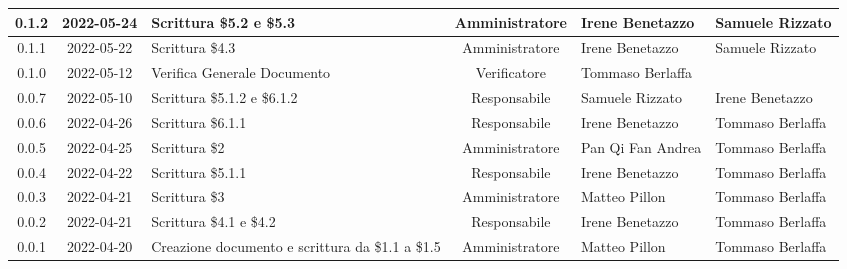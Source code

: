 \begin{center}
\begin{longtable}{ |c|c|p{8em}|c|m{5em}|m{5em}| }
	\hline
	0.1.2 & 2022-05-24 & Scrittura \$5.2 e \$5.3 & Amministratore & Irene \newline Benetazzo & Samuele \newline Rizzato \\
	\hline
	0.1.1 & 2022-05-22 & Scrittura \$4.3 & Amministratore & Irene \newline Benetazzo & Samuele \newline Rizzato \\
	\hline 
	0.1.0 & 2022-05-12 & Verifica Generale Documento & Verificatore & Tommaso \newline Berlaffa  & \\
    \hline
	0.0.7 & 2022-05-10 & Scrittura \$5.1.2 e \$6.1.2 & Responsabile & Samuele \newline Rizzato & Irene \newline Benetazzo \\
	\hline
	0.0.6 & 2022-04-26 & Scrittura \$6.1.1 & Responsabile & Irene \newline Benetazzo & Tommaso \newline Berlaffa\\
	\hline 
	0.0.5& 2022-04-25 & Scrittura \$2 & Amministratore & Pan Qi Fan \newline Andrea & Tommaso \newline Berlaffa\\
	\hline
	0.0.4 & 2022-04-22 & Scrittura \$5.1.1 & Responsabile & Irene \newline Benetazzo & Tommaso \newline Berlaffa\\
	\hline 
	0.0.3 & 2022-04-21 & Scrittura \$3 & Amministratore & Matteo \newline Pillon & Tommaso \newline Berlaffa\\
	\hline
	0.0.2 & 2022-04-21 & Scrittura \newline \$4.1 e \$4.2 & Responsabile & Irene \newline Benetazzo & Tommaso \newline Berlaffa\\
	\hline
    0.0.1 & 2022-04-20 & Creazione documento e scrittura \newline da \$1.1 a \$1.5 & Amministratore & Matteo \newline Pillon & Tommaso \newline Berlaffa \\ 
	\hline
	\end{longtable}
	\end{center}
	\newpage